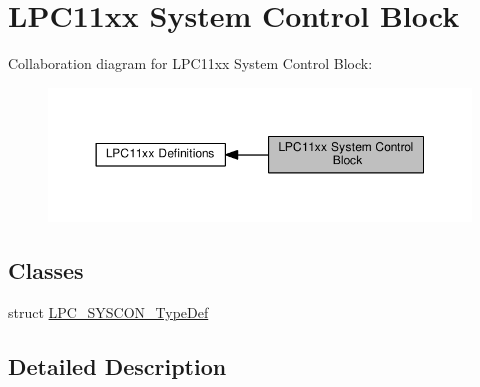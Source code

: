 \hypertarget{group___l_p_c11xx___s_y_s_c_o_n}{}\section{L\+P\+C11xx System Control Block}
\label{group___l_p_c11xx___s_y_s_c_o_n}
Collaboration diagram for L\+P\+C11xx System Control Block\+:\nopagebreak
\begin{figure}[H]
\begin{center}
\leavevmode
\includegraphics[width=350pt]{group___l_p_c11xx___s_y_s_c_o_n}
\end{center}
\end{figure}
\subsection*{Classes}
\begin{DoxyCompactItemize}
\item 
struct \hyperlink{struct_l_p_c___s_y_s_c_o_n___type_def}{L\+P\+C\+\_\+\+S\+Y\+S\+C\+O\+N\+\_\+\+Type\+Def}
\end{DoxyCompactItemize}


\subsection{Detailed Description}
